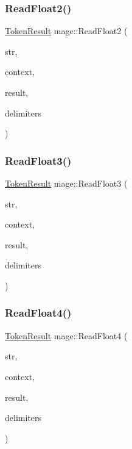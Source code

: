 \hypertarget{namespacemage_a544a1b747b516e80a75a260e902ccf67}{}\label{namespacemage_a544a1b747b516e80a75a260e902ccf67} 
\subsubsection{\texorpdfstring{Read\+Float2()}{ReadFloat2()}}
{\footnotesize\ttfamily \hyperlink{namespacemage_a2178ba2411db5912f41b2e7698c2037d}{Token\+Result} mage\+::\+Read\+Float2 (\begin{DoxyParamCaption}\item[{char $\ast$}]{str,  }\item[{char $\ast$$\ast$}]{context,  }\item[{X\+M\+F\+L\+O\+A\+T2 \&}]{result,  }\item[{const char $\ast$}]{delimiters }\end{DoxyParamCaption})}

\hypertarget{namespacemage_a433769b895f3199c55e44b9ff82dd67e}{}\label{namespacemage_a433769b895f3199c55e44b9ff82dd67e} 
\subsubsection{\texorpdfstring{Read\+Float3()}{ReadFloat3()}}
{\footnotesize\ttfamily \hyperlink{namespacemage_a2178ba2411db5912f41b2e7698c2037d}{Token\+Result} mage\+::\+Read\+Float3 (\begin{DoxyParamCaption}\item[{char $\ast$}]{str,  }\item[{char $\ast$$\ast$}]{context,  }\item[{X\+M\+F\+L\+O\+A\+T3 \&}]{result,  }\item[{const char $\ast$}]{delimiters }\end{DoxyParamCaption})}

\hypertarget{namespacemage_a50641f4da68522a4f74582f428f955d2}{}\label{namespacemage_a50641f4da68522a4f74582f428f955d2} 
\subsubsection{\texorpdfstring{Read\+Float4()}{ReadFloat4()}}
{\footnotesize\ttfamily \hyperlink{namespacemage_a2178ba2411db5912f41b2e7698c2037d}{Token\+Result} mage\+::\+Read\+Float4 (\begin{DoxyParamCaption}\item[{char $\ast$}]{str,  }\item[{char $\ast$$\ast$}]{context,  }\item[{X\+M\+F\+L\+O\+A\+T4 \&}]{result,  }\item[{const char $\ast$}]{delimiters }\end{DoxyParamCaption})}

